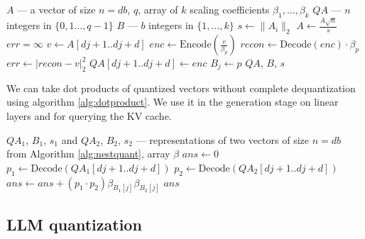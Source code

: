 \documentclass{article}
\theoremstyle{plain}
\theoremstyle{definition}
\theoremstyle{remark}
\begin{document}
\begin{algorithm}[h]
\caption{NestQuant}
\label{alg:nestquant}
\begin{algorithmic}
    $A$ --- a vector of size $n = db$, $q$, array of $k$ scaling coefficients $\beta_1,\ldots,\beta_k$
   \State $QA$ --- $n$ integers in $\{0,1\ldots,q-1\}$
   \State $B$ --- $b$ integers in $\{1,\ldots,k\}$ 
   \State \label{norm_nestquant} $s \leftarrow \lVert A_i\rVert_2$ 
   \State $A \leftarrow \frac{A\sqrt{n}}{s}$
        \State $err = \infty$
            \State $v \leftarrow A[dj+1..dj+d]$
            \State $enc \leftarrow \text{Encode}\left(\frac{v}{\beta_p}\right)$
            \State $recon \leftarrow \text{Decode}(enc) \cdot \beta_p$
                \State $err \leftarrow |recon - v|_2^2$
                \State $QA[dj+1..dj+d] \leftarrow enc$
                \State $B_{j} \leftarrow p$
            \EndIf
        \EndFor
   \EndFor
    $QA$, $B$, $s$
\end{algorithmic}
\end{algorithm}

We can take dot products of quantized vectors without complete dequantization using algorithm \ref{alg:dotproduct}. We use it in the generation stage on linear layers and for querying the KV cache.

\begin{algorithm}[h]
\caption{Dot product}
\label{alg:dotproduct}
\begin{algorithmic}
    $QA_1$, $B_1$, $s_1$ and $QA_2$, $B_2$, $s_2$ --- representations of two vectors of size $n = db$ from Algorithm \ref{alg:nestquant}, array $\beta$
   \State $ans \leftarrow 0$
        \State $p_1 \leftarrow \text{Decode}(QA_1[dj+1..dj+d])$
        \State $p_2 \leftarrow \text{Decode}(QA_2[dj+1..dj+d])$
        \State $ans \leftarrow ans + (p_1 \cdot p_2)\beta_{B_1[j]}\beta_{B_2[j]}$
   \EndFor
    $ans$
\end{algorithmic}
\end{algorithm}

\subsection{LLM quantization}
\end{document}

